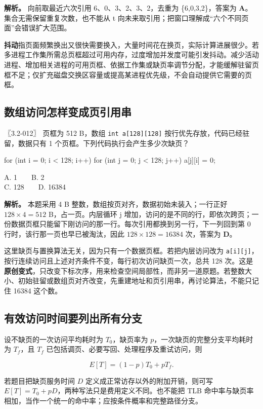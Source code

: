 \textbf{解析。} 向前取最近六次引用 6、0、3、2、3、2，去重为 \{6,0,3,2\}，答案为 \textbf{A}。集合无需保留重复次数，也不能从 t 向未来取引用；把窗口理解成``六个不同页面''会错误扩大范围。

\textbf{抖动}指页面频繁换出又很快需要换入，大量时间花在换页，实际计算进展很少。若多进程工作集所需总页框超过可用内存，过度增加并发度可能引发抖动。减少活动进程、增加相关进程的可用页框、依据工作集或缺页率调节分配，才能缓解驻留页框不足；仅扩充磁盘交换区容量或提高某进程优先级，不会自动提供它需要的页框。

\subsection{数组访问怎样变成页引用串}\label{OS03-auto-4}

〖3.2-012〗 页框为 512 B，数组 \texttt{int a[128][128]} 按行优先存放，代码已经驻留，数据只有 1 个页框。下列代码执行会产生多少次缺页？

\begin{codeblock}[language=C]
for (int i = 0; i < 128; i++)
    for (int j = 0; j < 128; j++)
        a[j][i] = 0;
\end{codeblock}

A. 1　　B. 2\\
C. 128　　D. 16384

\textbf{解析。} 本题采用 4 B 整数，数组按页对齐，数据初始未装入；一行正好 \(128\times4=512\) B，占一页。内层循环 j 增加，访问的是不同的行，即依次跨页；一份数据页框只能留下刚访问的那一行。每次引用都换到另一行，下一列回到第 0 行时，该行那一页也早已被淘汰，因此 \(128\times128=16384\) 次，答案为 \textbf{D}。

这里缺页与置换算法无关，因为只有一个数据页框。若把内层访问改为 \texttt{a[i][j]}，按行连续访问且上述对齐条件不变，每行初次访问缺页一次，总共 128 次。这是\textbf{原创变式}，只改变下标次序，用来检查空间局部性，而非另一道原题。若整数大小、初始驻留或数组页对齐改变，先重建地址和页引用串，再讨论算法，不能只记住 16384 这个数。

\subsection{有效访问时间要列出所有分支}\label{OS03-auto-5}

设不缺页的一次访问平均耗时为 \(T_0\)，缺页率为 \(p\)，一次缺页的完整分支平均耗时为 \(T_f\)，且 \(T_f\) 已包括调页、必要写回、处理程序及重试访问，则

\[E[T]=(1-p)T_0+pT_f.\]

若题目把缺页服务时间 \(D\) 定义成正常访存以外的附加开销，则可写 \(E[T]=T_0+pD\)，两种写法只是费用定义不同。也不能把 TLB 命中率与缺页率相加，当作一个统一的命中率；应按条件概率和完整路径分支。

